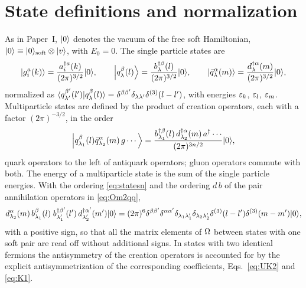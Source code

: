 \section{State definitions and normalization}
\label{app:states}

As in Paper~I, $|0\rangle$ denotes the vacuum of the free soft Hamiltonian, $|0\rangle\equiv|0\rangle_{\rm soft}\otimes|v\rangle$,
with $E_{0}=0$. The single particle states are
\begin{equation}
\left|g^{a}_{i}(k)\right\rangle=\frac{a^{\dagger a}_{i}(k)}{(2\pi)^{3/2}}|0\rangle,\qquad
\left|q^{\beta}_{\lambda}(l)\right\rangle=\frac{b^{\dagger\beta}_{\lambda}(l)}{(2\pi)^{3/2}}|0\rangle,\qquad
\left|\bar q^{\alpha}_{\lambda}(m)\right\rangle=\frac{d^{\dagger\alpha}_{\lambda}(m)}{(2\pi)^{3/2}}|0\rangle,
\label{eq:states1}
\end{equation}
normalized as
$\langle q^{\beta'}_{\lambda'}(l')|q^{\beta}_{\lambda}(l)\rangle=\delta^{\beta\beta'}\delta_{\lambda\lambda'}\delta^{(3)}(l-l')$,
with energies $\varepsilon_{k}$, $\varepsilon_{l}$, $\varepsilon_{m}$. Multiparticle states are defined by the product of
creation operators, each with a factor $(2\pi)^{-3/2}$, in the order
\begin{equation}
\left|q^{\beta}_{\lambda_{1}}(l)\bar q^{\alpha}_{\lambda_{2}}(m)\,g\cdots\right\rangle=
\frac{b^{\dagger\beta}_{\lambda_{1}}(l)\,d^{\dagger\alpha}_{\lambda_{2}}(m)\,a^{\dagger}\cdots}{(2\pi)^{3n/2}}|0\rangle ,
\label{eq:statesn}
\end{equation}
quark operators to the left of antiquark operators; gluon operators commute with both. The energy of
a multiparticle state is the sum of the single particle energies. With the ordering
\eqref{eq:statesn} and the ordering $d\,b$ of the pair annihilation operators in \eqref{eq:Om2qq},
\begin{equation}
d^{\alpha}_{\lambda_{2}}(m)\,b^{\beta}_{\lambda_{1}}(l)\;b^{\dagger\beta'}_{\lambda_{1}'}(l')\,d^{\dagger\alpha'}_{\lambda_{2}'}(m')|0\rangle
=(2\pi)^{6}\delta^{\beta\beta'}\delta^{\alpha\alpha'}\delta_{\lambda_{1}\lambda_{1}'}\delta_{\lambda_{2}\lambda_{2}'}
\delta^{(3)}(l-l')\delta^{(3)}(m-m')|0\rangle,
\end{equation}
with a positive sign, so that all the matrix elements of $\Omega$ between states with one soft pair are
read off without additional signs. In states with two identical fermions the antisymmetry of the
creation operators is accounted for by the explicit antisymmetrization of the corresponding
coefficients, Eqs.~\eqref{eq:UK2} and \eqref{eq:K1}.

